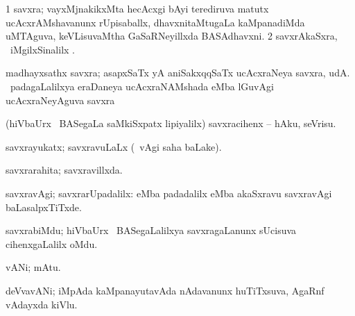 {{{{{{{{{{{{{{\bentry
{} 
\gl{\nA}
\expl{}
\bmng
\bnum
\num{1} savxra; vayxMjnakikxMta hecAcxgi bAyi terediruva matutx ucAcxrAMshavanunx rUpisaballx, dhavxnitaMtugaLa kaMpanadiMda uMTAguva, keVLisuvaMtha GaSaRNeyillxda BASAdhavxni. 
\num{2} savxrAkaSxra, \udA\ iMgilxSinalilx . 
\enum
\emng

\noindent 
\gl{\pagu}
\expl{}
\bmng
   madhayxsathx savxra; asapxSaTx yA aniSakxqqSaTx ucAcxraNeya savxra, udA.  \mo\ padagaLalilxya eraDaneya ucAcxraNAMshada  eMba lGuvAgi ucAcxraNeyAguva savxra  
\emng
\eentry

\bentry
{}
\gl{\nA}
\expl{}
\bmng
\emng
\eentry

\bentry
{} 
\gl{\sakirx}
\expl{}
\bmng
\emng
\eentry

\bentry
{} 
\gl{\sakirx}
\expl{}
\bmng
 (hiVbaUrx \mo\ BASegaLa saMkiSxpatx lipiyalilx) savxracihenx -- hAku, seVrisu. 
\emng
\eentry

\bentry
{} 
\gl{\gu}
\expl{}
\bmng
 savxrayukatx; savxravuLaLx (\saMpa\ vAgi saha baLake). 
\emng
\eentry

\bentry
{} 
\gl{\gu}
\expl{}
\bmng
 savxrarahita; savxravillxda. 
\emng
\eentry

\bentry 
{} 
\gl{\kirxvi}
\expl{}
\bmng
 savxravAgi; savxrarUpadalilx:  eMba padadalilx  eMba akaSxravu savxravAgi baLasalpxTiTxde. 
\emng
\eentry

\bentry
{}
\gl{\nA}
\expl{}
\bmng
\emng
\eentry

\bentry
{} 
\pron{}
\gl{\nA}
\expl{}
\bmng
 savxrabiMdu; hiVbaUrx \mo\ BASegaLalilxya savxragaLanunx sUcisuva cihenxgaLalilx oMdu. 
\emng
\eentry

\bentry 
{} 
\gl{\nA}
\expl{}
\bmng
 vANi; mAtu. 
\emng
\eentry

\bentry 
{} 
\gl{\nA}
\expl{\Latin}
\bmng
deVvavANi; iMpAda kaMpanayutavAda nAdavanunx huTiTxsuva, AgaRnf vAdayxda kiVlu. 
\emng
\eentry

}}}}}}}}}}}}}}
